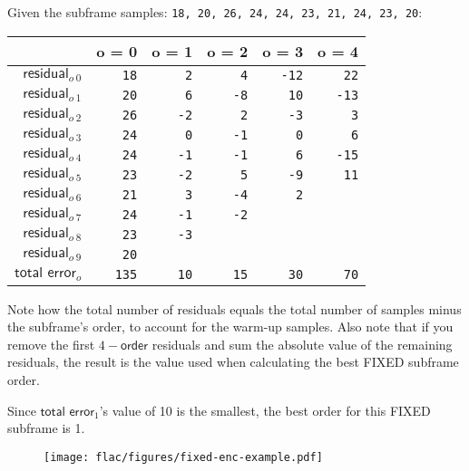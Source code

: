 Given the subframe samples: \texttt{18, 20, 26, 24, 24, 23, 21, 24, 23, 20}:
\begin{table}[h]
\begin{tabular}{r|r|r|r|r|r}
& o = 0 & o = 1 & o = 2 & o = 3 & o = 4 \\
\hline
$\textsf{residual}_{o~0}$ & \texttt{\color{gray}18} & \texttt{\color{gray}2} & \texttt{\color{gray}4} & \texttt{\color{gray}-12} & \texttt{22} \\
$\textsf{residual}_{o~1}$ & \texttt{\color{gray}20} & \texttt{\color{gray}6} & \texttt{\color{gray}-8} & \texttt{10} & \texttt{-13} \\
$\textsf{residual}_{o~2}$ & \texttt{\color{gray}26} & \texttt{\color{gray}-2} & \texttt{2} & \texttt{-3} & \texttt{3} \\
$\textsf{residual}_{o~3}$ & \texttt{\color{gray}24} & \texttt{0} & \texttt{-1} & \texttt{0} & \texttt{6} \\
$\textsf{residual}_{o~4}$ & \texttt{24} & \texttt{-1} & \texttt{-1} & \texttt{6} & \texttt{-15} \\
$\textsf{residual}_{o~5}$ & \texttt{23} & \texttt{-2} & \texttt{5} & \texttt{-9} & \texttt{11} \\
$\textsf{residual}_{o~6}$ & \texttt{21} & \texttt{3} & \texttt{-4} & \texttt{2} \\
$\textsf{residual}_{o~7}$ & \texttt{24} & \texttt{-1} & \texttt{-2} \\
$\textsf{residual}_{o~8}$ & \texttt{23} & \texttt{-3} \\
$\textsf{residual}_{o~9}$ & \texttt{20} \\
\hline
$\textsf{total error}_{o}$ & \texttt{135} & \texttt{10} & \texttt{15} & \texttt{30} & \texttt{70} \\
\end{tabular}
\end{table}
\par
\noindent
Note how the total number of residuals equals the
total number of samples minus the subframe's order,
to account for the warm-up samples.
Also note that if you remove the first $4 - \textsf{order}$ residuals
and sum the absolute value of the remaining residuals,
the result is the  value
used when calculating the best FIXED subframe order.
\par
Since $\textsf{total error}_1$'s value of 10 is the smallest,
the best order for this FIXED subframe is 1.

\begin{figure}[h]
  \texttt{[image: flac/figures/fixed-enc-example.pdf]}
\end{figure}
